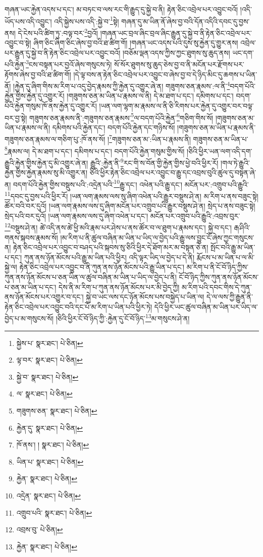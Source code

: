 གཞན་ཡང་རྐྱེན་འདས་པ་དང་། མ་བཏང་བ་ལས་རང་གི་རྒྱུད་དུ་སྐྱེ་བ་ནི། རྟེན་ཅིང་འབྲེལ་པར་འབྱུང་བའོ། །འདི་ཡོད་པས་འདི་འབྱུང་། འདི་སྐྱེས་པས་འདི་:སྐྱེ་བ་\footnote{སྐྱེས་པ་  སྣར་ཐང་།  པེ་ཅིན། }སྟེ། གཞན་དུ་མ་ཡིན་ནོ་ཞེས་བྱ་བའི་དོན་འདིའི་དབང་དུ་བྱས་ནས། དེ་ངེས་པའི་ཚིག་ཏུ་:བལྟ་བར་\footnote{ལྟ་བར་  སྣར་ཐང་།  པེ་ཅིན། }བྱའོ། །གཞན་ཡང་བྲལ་ཞིང་བྲལ་ཞིང་རྒྱུན་དུ་སྐྱེ་བ་ནི་རྟེན་ཅིང་འབྲེལ་པར་འབྱུང་བ་སྟེ། ཞིག་ཅིང་ཞིག་ཅིང་ཞེས་བྱ་བའི་ཐ་ཚིག་གོ། །གཞན་ཡང་འདས་པའི་དུས་སུ་རྐྱེན་དུ་གྱུར་ནས། འབྲེལ་པར་རྒྱུན་དུ་སྐྱེ་བ་ནི་རྟེན་ཅིང་འབྲེལ་པར་འབྱུང་བའོ། །བཅོམ་ལྡན་འདས་ཀྱིས་ཀྱང་ཐུགས་སུ་ཆུད་ནས། ཡང་དག་པའི་རྐྱེན་\footnote{སྐྱེ་བ་  སྣར་ཐང་།  པེ་ཅིན། }ངས་བསྟན་པར་བྱའོ་ཞེས་གསུངས་ཏེ། སོ་སོར་ཐུགས་སུ་ཆུད་ཅེས་བྱ་བ་ནི་མངོན་པར་རྫོགས་པར་རྟོགས་ཞེས་བྱ་བའི་ཐ་ཚིག་གོ། །དེ་ལྟ་བས་ན་རྟེན་ཅིང་འབྲེལ་པར་འབྱུང་བ་ཞེས་བྱ་བ་དེ་ཉིད་མིང་དུ་ཆགས་པ་ཡིན་ནོ། །རྐྱེན་དུ་ཞིག་གིས་མ་རིག་པ་འདུ་བྱེད་རྣམས་ཀྱི་རྐྱེན་དུ་འགྱུར་ཞེ་ན། གཟུགས་ཅན་རྣམས་:ལ་ནི་\footnote{ལ་  སྣར་ཐང་།  པེ་ཅིན། }བདག་པོའི་རྐྱེན་གྱིས་རྐྱེན་དུ་འགྱུར་རོ། །གཟུགས་ཅན་མ་ཡིན་པ་རྣམས་ལ་ནི། དེ་མ་ཐག་པ་དང་། དམིགས་པ་དང་། བདག་པོའི་རྐྱེན་གསུམ་ཁོ་ནས་རྐྱེན་དུ་འགྱུར་རོ། །ཡན་ལག་ལྷག་མ་རྣམས་ལ་ནི་ཅི་རིགས་པར་རྐྱེན་དུ་འགྱུར་བར་བལྟ་བར་བྱ་སྟེ། གཟུགས་ཅན་རྣམས་ནི་:གཟུགས་ཅན་རྣམས་\footnote{གཟུགས་ཅན་  སྣར་ཐང་།  པེ་ཅིན། }ལ་བདག་པོའི་རྐྱེན་\footnote{རྐྱེན་དུ་  སྣར་ཐང་།  པེ་ཅིན། }གཅིག་གིས་སོ། །གཟུགས་ཅན་མ་ཡིན་པ་རྣམས་ལ་ནི། དམིགས་པའི་རྐྱེན་དང་། བདག་པོའི་རྐྱེན་དང་གཉིས་སོ། །གཟུགས་ཅན་མ་ཡིན་པ་རྣམས་ནི་གཟུགས་ཅན་རྣམས་ལ་གཅིག་པུ་:ཁོ་ནས་སོ། །\footnote{ཁོ་ནས་། །   སྣར་ཐང་།  པེ་ཅིན། }གཟུགས་ཅན་མ་:ཡིན་པ་རྣམས་ནི། གཟུགས་ཅན་མ་ཡིན་པ་\footnote{ཡིན་པ་  སྣར་ཐང་།  པེ་ཅིན། }རྣམས་ལ། དེ་མ་ཐག་པ་དང་། དམིགས་པ་དང་། བདག་པོའི་རྐྱེན་གསུམ་གྱིས་སོ། །ཅིའི་ཕྱིར་ཡན་ལག་འདི་དག་རྒྱུའི་རྐྱེན་གྱིས་རྐྱེན་དུ་མི་འགྱུར་ཞེ་ན། རྒྱུའི་:རྐྱེན་ནི་\footnote{རྐྱེན་  སྣར་ཐང་།  པེ་ཅིན། }རང་གི་ས་བོན་གྱི་རྐྱེན་གྱིས་ཕྱེ་བའི་ཕྱིར་རོ། །གལ་ཏེ་རྒྱུའི་རྐྱེན་གྱིས་རྐྱེན་རྣམས་སུ་མི་འགྱུར་ན། ཅིའི་ཕྱིར་རྟེན་ཅིང་འབྲེལ་པར་འབྱུང་བ་རྒྱུ་དང་འབྲས་བུའི་ཚུལ་དུ་བསྟན་ཞེ་ན། བདག་པོའི་རྐྱེན་གྱིས་བསྡུས་པའི་:འདྲེན་པའི་\footnote{འདྲེན་  སྣར་ཐང་།  པེ་ཅིན། }རྒྱུ་དང་། འཕེན་པའི་རྒྱུ་དང་། མངོན་པར་:འགྲུབ་པའི་རྒྱུའི་\footnote{འགྲུབ་པའི་  སྣར་ཐང་།  པེ་ཅིན། }དབང་དུ་བྱས་པའི་ཕྱིར་རོ། །ཡན་ལག་རྣམས་ལས་སུ་ཞིག་འཕེན་པའི་རྒྱུར་བསྡུས་ཤེ་ན། མ་རིག་པ་ནས་བཟུང་སྟེ། ཚོར་བའི་བར་དུའོ། །ཡན་ལག་རྣམས་ལས་དུ་ཞིག་མངོན་པར་འགྲུབ་པའི་རྒྱུར་བསྡུས་ཤེ་ན། སྲེད་པ་ནས་བཟུང་སྟེ། སྲེད་པའི་བར་དུའོ། །ཡན་ལག་རྣམས་ལས་དུ་ཞིག་འཕེན་པ་དང་། མངོན་པར་འགྲུབ་པའི་རྒྱུའི་:འབྲས་བུར་\footnote{འབྲས་བུ་  པེ་ཅིན། }བསྡུས་ཤེ་ན། ཚེ་འདི་ནས་ཚེ་ཕྱི་མའི་རྣམ་པར་ཤེས་པ་ནས་ཚོར་བ་ལ་ཐུག་པ་རྣམས་དང་། སྐྱེ་བ་དང་། རྒ་ཤིའི་གནས་སྐབས་རྣམས་སོ། །མ་རིག་པ་ནི་ཚུལ་བཞིན་མ་ཡིན་པ་ཡིད་ལ་བྱེད་པའི་རྒྱུ་ལས་བྱུང་ངོ་ཞེས་ཀྱང་གསུངས་ན། རྟེན་ཅིང་འབྲེལ་པར་འབྱུང་བ་བཤད་པའི་སྐབས་སུ་ཅིའི་ཕྱིར་དེ་ཐོག་མར་མ་བསྟན་ཅེ་ན། སྤོང་བའི་རྒྱུ་མ་ཡིན་པ་དང་། ཀུན་ནས་ཉོན་མོངས་པའི་རྒྱུ་མ་ཡིན་པའི་ཕྱིར། འདི་ལྟར་ཡིད་ལ་བྱེད་པ་དེ་ནི། རྨོངས་པ་མ་ཡིན་པ་ལ་མི་སྐྱེ་ལ། རྟེན་ཅིང་འབྲེལ་པར་འབྱུང་བ་ནི་ཀུན་ནས་ཉོན་མོངས་པའི་རྒྱུ་ཡིན་པ་དང་། མ་རིག་པ་ནི་ངོ་བོ་ཉིད་ཀྱིས་ཀུན་ནས་ཉོན་མོངས་པ་ཅན་ཡིན་ལ་ཚུལ་བཞིན་མ་ཡིན་པ་ཡིད་ལ་བྱེད་པ་ནི། ངོ་བོ་ཉིད་ཀྱིས་ཀུན་ནས་ཉོན་མོངས་པ་ཅན་མ་ཡིན་པ་དང་། དེས་ནི་མ་རིག་པ་ཀུན་ནས་ཉོན་མོངས་པར་མི་བྱེད་ཀྱི། མ་རིག་པའི་དབང་གིས་དེ་ཀུན་ནས་ཉོན་མོངས་པར་འགྱུར་བ་དང་། སྐྱེ་བ་ཡང་ལས་དང་ཉོན་མོངས་པས་བསྐྱེད་པ་ཡིན་ལ། དེ་ལ་ལས་ཀྱི་རྒྱུན་ནི་རྟེན་ཅིང་འབྲེལ་པར་འབྱུང་བའི་དང་པོ་མ་རིག་པ་ཡིན་པའི་ཕྱིར་ཏེ། དེའི་ཕྱིར་ཡང་ཚུལ་བཞིན་མ་ཡིན་པར་ཡིད་ལ་བྱེད་པ་མ་གསུངས་སོ། །ཅིའི་ཕྱིར་ངོ་བོ་ཉིད་ཀྱི་:རྐྱེན་དུ་ངོ་བོ་ཉིད་\footnote{རྐྱེན་  སྣར་ཐང་།  པེ་ཅིན། }མ་གསུངས་ཤེ་ན། 